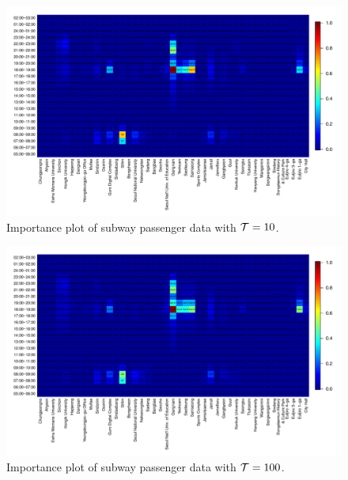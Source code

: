 \documentclass[preprint, review, 12pt]{article}
\theoremstyle{definition}
\theoremstyle{remark}
\begin{document}
\begin{figure}
	\centering
	\includegraphics[width=1.05\textwidth]{Fig/In_scale_1.pdf}
	\vspace{-13mm}
	\caption{Importance plot of subway passenger data with ${\cal T}=10$.}
	\label{snow:subway_in_01}
\end{figure}

\begin{figure}
	\centering
	\includegraphics[width=1.05\textwidth]{Fig/In_scale_2.pdf}
	\vspace{-13mm}
	\caption{Importance plot of subway passenger data with ${\cal T}=100$.}
	\label{snow:subway_in_1}
\end{figure}
\end{document}

